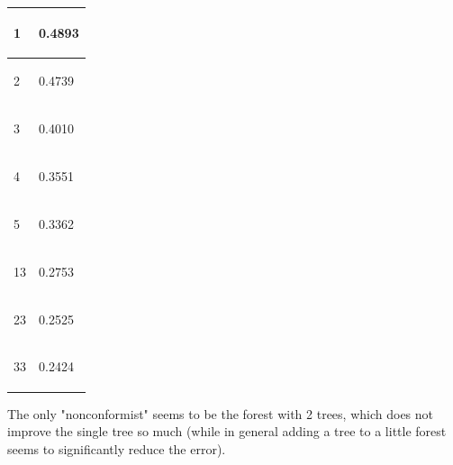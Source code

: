 \documentclass[12pt]{article}
\begin{document}
\begin{table}[!h]
\centering

\begin{tabular}{|p{}|p{}|}
\hline
\begin{center}
1
\end{center}
& \begin{center}
0.4893
\end{center}
\\
\hline
\begin{center}
2
\end{center}
& \begin{center}
0.4739
\end{center}
\\
\hline
\begin{center}
3
\end{center}
& \begin{center}
0.4010
\end{center}
\\
\hline
\begin{center}
4
\end{center}
& \begin{center}
0.3551
\end{center}
\\
\hline
\begin{center}
5
\end{center}
& \begin{center}
0.3362
\end{center}
\\
\hline
\begin{center}
13
\end{center}
& \begin{center}
0.2753
\end{center}
\\
\hline
\begin{center}
23
\end{center}
& \begin{center}
0.2525
\end{center}
\\
\hline
\begin{center}
33
\end{center}
& \begin{center}
0.2424
\end{center}
\\
\hline
\end{tabular}
\end{table}
The only "nonconformist" seems to be the forest with 2 trees, which does not improve the single tree so much (while in general adding a tree to a little forest seems to significantly reduce the error).\\
\end{document}

